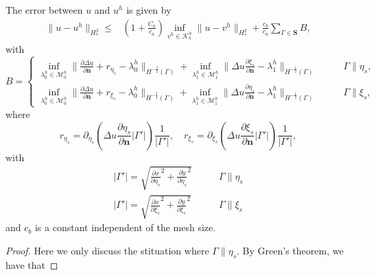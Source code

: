 \begin{theorem}\label{thm:fea-approx}
  The error between $u$ and $u^h$ is given by
  \begin{equation}
    \begin{split}
      \|u-u^h\|_{H^2_*}\leq &{\left(1+\frac{C_a}{c_a}\right)}\inf_{v^h\in{\mathcal{K}_b^h}}\|u-v^h\|_{H^2_*}+\frac{c_b}{c_a}\sum_{\Gamma\in \mathbf{S}}B,
    \end{split}
    \label{eq:fem_approximation}
  \end{equation}
  with
  \begin{equation}
    B= \left\{\begin{split}
      \inf_{\lambda_0^h\in \mathcal{M}_0^h}\| \frac{\partial \Delta u}{\partial \mathbf{n}} + r_{\eta_s} - \lambda_0^h \|_{H^{-\frac{3}{2}}(\Gamma)}+ \inf_{\lambda_1^h\in \mathcal{M}_1^h} \| \Delta u \frac{\partial \xi_s}{\partial \mathbf{n}} - \lambda_1^h \|_{H^{-\frac{1}{2}}(\Gamma)}\quad\quad &\Gamma\parallel \eta_s,\\
      \inf_{\lambda_0^h\in \mathcal{M}_0^h}\| \frac{\partial \Delta u}{\partial \mathbf{n}} + r_{\xi_s} - \lambda_0^h \|_{H^{-\frac{3}{2}}(\Gamma)}+ \inf_{\lambda_1^h\in \mathcal{M}_1^h} \| \Delta u \frac{\partial \eta_s}{\partial \mathbf{n}} - \lambda_1^h \|_{H^{-\frac{1}{2}}(\Gamma)}\quad \quad&\Gamma\parallel \xi_s,
    \end{split}\right.
  \end{equation}
  where
  \begin{equation}
    r_{\eta_s} = \partial_{\eta_s}\left(\Delta u \frac{\partial \eta_s}{\partial \mathbf{n}}\vert \Gamma' \vert\right)\frac{1}{\vert \Gamma' \vert},\quad r_{\xi_s} = \partial_{\xi_s}\left(\Delta u \frac{\partial \xi_s}{\partial \mathbf{n}}\vert \Gamma' \vert\right)\frac{1}{\vert \Gamma' \vert},
  \end{equation}
  with
  \begin{equation}
    \begin{split}
      \vert \Gamma' \vert = \sqrt{\frac{\partial x}{\partial \eta_s}^2+\frac{\partial y}{\partial \eta_s}^2}\quad\quad &\Gamma\parallel \eta_s\\
      \vert \Gamma' \vert = \sqrt{\frac{\partial x}{\partial \xi_s}^2+\frac{\partial y}{\partial \xi_s}^2}\quad\quad &\Gamma\parallel \xi_s
    \end{split}
  \end{equation}
  and $c_b$ is a constant independent of the mesh size.
  \begin{proof}
    Here we only discuss the stituation where $\Gamma\parallel \eta_s$. By Green's theorem, we have that

\end{proof}
\end{theorem}
